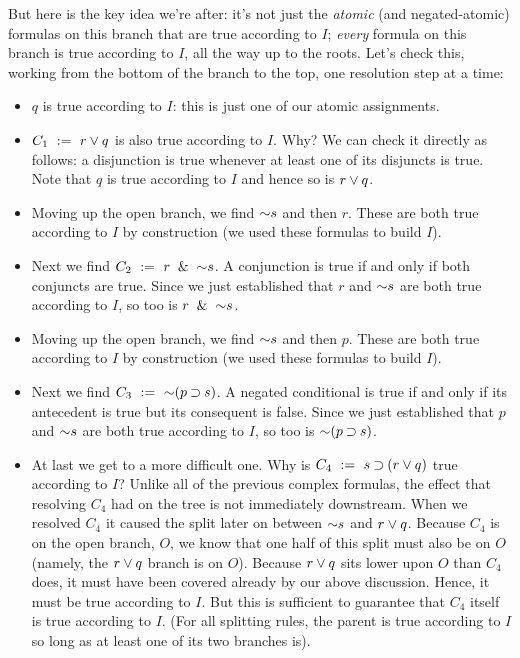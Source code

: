 \documentclass[options]{philosophersimprint}
\begin{document}
But here is the key idea we're after: it's not just the \textit{atomic} (and negated-atomic) formulas on this branch that are true according to $I$; \textit{every} formula on this branch is true according to $I$, all the way up to the roots. Let's check this, working from the bottom of the branch to the top, one resolution step at a time:
\begin{itemize}
    \item $q$ is true according to $I$: this is just one of our atomic assignments.
    \item $C_1 \ := \ r\mathbin{\vee} q$ is also true according to $I$. Why? We can check it directly as follows: a disjunction is true whenever at least one of its disjuncts is true. Note that $q$ is true according to $I$ and hence so is $r\mathbin{\vee} q$.
    \item Moving up the open branch, we find $\mathord{\sim} s$ and then $r$. These are both true according to $I$ by construction (we used these formulas to build $I$).
    \item Next we find $C_2 \ := \ r\ \mathbin{\&} \ \mathord{\sim} s$. A conjunction is true if and only if both conjuncts are true. Since we just established that $r$ and $\mathord{\sim} s$ are both true according to $I$, so too is $r\ \mathbin{\&} \ \mathord{\sim} s$.
    \item Moving up the open branch, we find $\mathord{\sim} s$ and then $p$. These are both true according to $I$ by construction (we used these formulas to build $I$).
    \item Next we find $C_3 \ := \ \mathord{\sim}(p\mathbin{\supset} s)$. A negated conditional is true if and only if its antecedent is true but its consequent is false. Since we just established that $p$ and $\mathord{\sim} s$ are both true according to $I$, so too is $\mathord{\sim}(p\mathbin{\supset} s)$.
    \item At last we get to a more difficult one. Why is $C_4 \ := \ s\mathbin{\supset} (r \mathbin{\vee} q)$ true according to $I$? Unlike all of the previous complex formulas, the effect that resolving $C_4$ had on the tree is not immediately downstream. When we resolved $C_4$ it caused the split later on between $\mathord{\sim} s$ and $r\mathbin{\vee} q$. Because $C_4$ is on the open branch, $O$, we know that one half of this split must also be on $O$ (namely, the $r\mathbin{\vee} q$ branch is on $O$). Because $r\mathbin{\vee} q$ sits lower upon $O$ than $C_4$ does, it must have been covered already by our above discussion. Hence, it must be true according to $I$. But this is sufficient to guarantee that $C_4$ itself is true according to $I$. (For all splitting rules, the parent is true according to $I$ so long as at least one of its two branches is).

\end{itemize}
\end{document}
